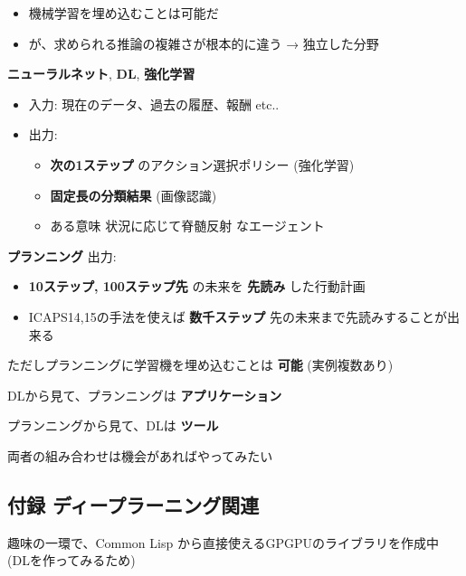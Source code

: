 \begin{itemize}
\item 機械学習を埋め込むことは可能だ
\item が、求められる推論の複雑さが根本的に違う → 独立した分野
\end{itemize}

\begin{container-fluid}
\begin{row-fluid}
\begin{span7}
\textbf{ニューラルネット}, \textbf{DL}, \textbf{強化学習}
\begin{itemize}
\item 入力: 現在のデータ、過去の履歴、報酬 etc..
\item 出力:
\begin{itemize}
\item \textbf{次の1ステップ} のアクション選択ポリシー (強化学習)
\item \textbf{固定長の分類結果} (画像認識)
\item ある意味 状況に応じて脊髄反射 なエージェント
\end{itemize}
\end{itemize}
\end{span7}
\begin{span5}
\textbf{プランニング}
出力:
\begin{itemize}
\item \textbf{10ステップ, 100ステップ先} の未来を \textbf{先読み} した行動計画
\item ICAPS14,15の手法を使えば \textbf{数千ステップ} 先の未来まで先読みすることが出来る
\end{itemize}
\end{span5}
\end{row-fluid}
\end{container-fluid}

ただしプランニングに学習機を埋め込むことは \textbf{可能} (実例複数あり)

DLから見て、プランニングは \textbf{アプリケーション}

プランニングから見て、DLは \textbf{ツール}

両者の組み合わせは機会があればやってみたい

\subsection{付録 ディープラーニング関連}
\label{sec-5-9}

趣味の一環で、Common Lisp から直接使えるGPGPUのライブラリを作成中 (DLを作ってみるため)

